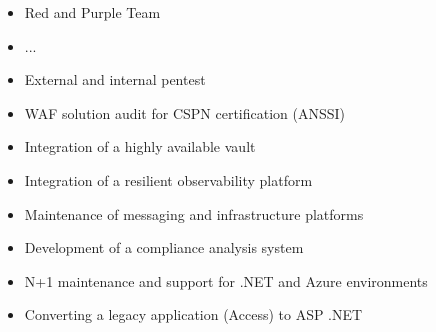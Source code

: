 \documentclass[10pt,a4paper,ragged2e,withhyper]{altacv}
\begin{document}
\begin{paracol}{2}

\begin{itemize}
  \item Red and Purple Team
  \item ...
  \item External and internal pentest
  \item WAF solution audit for CSPN certification (ANSSI)
\end{itemize}

\divider

\begin{itemize}
  \item Integration of a highly available vault
  \item Integration of a resilient observability platform
  \item Maintenance of messaging and infrastructure platforms
\end{itemize}

\divider

\begin{itemize}
  \item Development of a compliance analysis system
  \item N+1 maintenance and support for .NET and Azure environments
\end{itemize}

\divider

\begin{itemize}
  \item Converting a legacy application (Access) to ASP .NET
\end{itemize}



\end{paracol}
\end{document}
